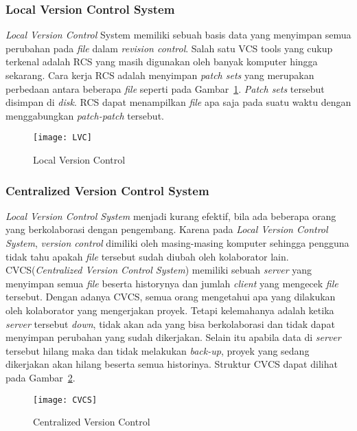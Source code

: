 \subsubsection{Local Version Control System}
\textit{Local Version Control} System memiliki sebuah basis data yang menyimpan semua perubahan pada \textit{file} dalam \textit{revision control}. Salah satu VCS tools yang cukup terkenal adalah RCS yang masih digunakan oleh banyak komputer hingga sekarang. Cara kerja RCS adalah menyimpan \textit{patch sets} yang merupakan perbedaan antara beberapa \textit{file} seperti pada Gambar~\ref{fig:LVC}. \textit{Patch sets} tersebut disimpan di \textit{disk}. RCS dapat menampilkan \textit{file} apa saja pada suatu waktu dengan menggabungkan \textit{patch-patch} tersebut.  

\begin{figure}[H]
	\centering  
	\texttt{[image: LVC]}  
	\caption[Local Version Control]{Local Version Control}
	\label{fig:LVC} 
\end{figure}

\subsubsection{Centralized Version Control System}
\textit{Local Version Control System} menjadi kurang efektif, bila ada beberapa orang yang berkolaborasi dengan pengembang. Karena pada \textit{Local Version Control System}, \textit{version control} dimiliki oleh masing-masing komputer sehingga pengguna tidak tahu apakah \textit{file} tersebut sudah diubah oleh kolaborator lain. CVCS(\textit{Centralized Version Control System}) memiliki sebuah \textit{server} yang menyimpan semua \textit{file} beserta historynya dan jumlah \textit{client} yang mengecek \textit{file} tersebut. Dengan adanya CVCS, semua orang mengetahui apa yang dilakukan oleh kolaborator yang mengerjakan proyek. Tetapi kelemahanya adalah ketika \textit{server} tersebut \textit{down}, tidak akan ada yang bisa berkolaborasi dan tidak dapat menyimpan perubahan yang sudah dikerjakan. Selain itu apabila data di \textit{server} tersebut hilang maka dan tidak melakukan \textit{back-up}, proyek yang sedang dikerjakan akan hilang beserta semua historinya. Struktur CVCS dapat dilihat pada Gambar~\ref{fig:CVCS}.

\begin{figure}[H]
	\centering  
	\texttt{[image: CVCS]}  
	\caption[Centralized Version Control]{Centralized Version Control}
	\label{fig:CVCS} 
\end{figure}

